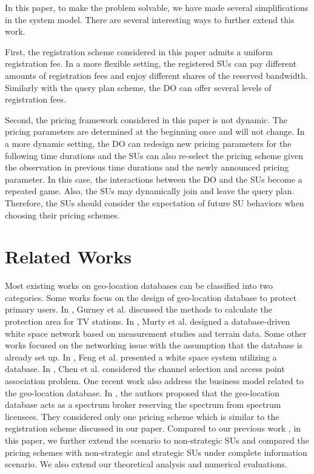\documentclass[journal]{IEEEtran}
\begin{document}
In this paper, to make the problem solvable, we have made several simplifications in the system model. There are several interesting ways to further extend this work.

First, the registration scheme considered in this paper admits a uniform registration fee. In a more flexible setting, the registered SUs can pay different amounts of registration fees and enjoy different shares of the reserved bandwidth. Similarly with the query plan scheme, the DO can offer several levels of registration fees.

Second, the pricing framework considered in this paper is not dynamic. The pricing parameters are determined at the beginning once and will not change. In a more dynamic setting, the DO can redesign new pricing parameters for the following time durations and the SUs can also re-select the pricing scheme given the observation in previous time durations and the newly announced pricing parameter. In this case, the interactions between the DO and the SUs become a repeated game. Also, the SUs may dynamically join and leave the query plan. Therefore, the SUs should consider the expectation of future SU behaviors when choosing their pricing schemes.

\section{Related Works}
\label{sec:related_works}

Most existing works on geo-location databases can be classified into two categories. Some works focus on the design of geo-location database to protect primary users. In \cite{database_dyspan08}, Gurney et al. discussed the methods to calculate the protection area for TV stations. In \cite{database_dyspan11}, Murty et al. designed a database-driven white space network based on measurement studies and terrain data. Some other works focused on the networking issue with the assumption that the database is already set up. In \cite{database}, Feng et al. presented a white space system utilizing a database. In \cite{database_icdcs12}, Chen et al. considered the channel selection and access point association problem.
One recent work \cite{database_icc12} also address the business model related to the geo-location database. In \cite{database_icc12}, the authors proposed that the geo-location database acts as a spectrum broker reserving the spectrum from spectrum licensees. They considered only one pricing scheme which is similar to the registration scheme discussed in our paper.
Compared to our previous work \cite{databasePricing}, in this paper, we further extend the scenario to non-strategic SUs and compared the pricing schemes with non-strategic and strategic SUs under complete information scenario. We also extend our theoretical analysis and numerical evaluations.
\end{document}
